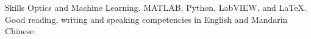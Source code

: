 
\begin{rubric}{Skills}
	Optics and Machine Learning.
	MATLAB, Python, LabVIEW, and \LaTeX.
\entry*[Languages]
	Good reading, writing and speaking competencies in English and Mandarin Chinese.
\end{rubric}
